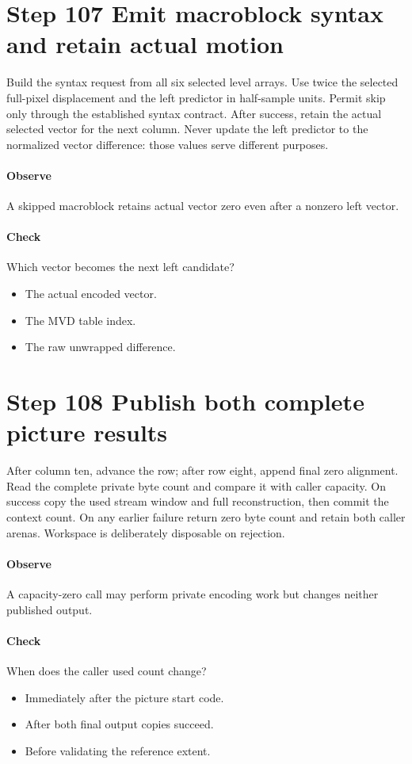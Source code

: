 \section{Step 107 Emit macroblock syntax and retain actual motion}\label{h263-picture-s07}
Build the syntax request from all six selected level arrays. Use twice the
selected full-pixel displacement and the left predictor in half-sample units.
Permit skip only through the established syntax contract. After success, retain
the actual selected vector for the next column. Never update the left predictor
to the normalized vector difference: those values serve different purposes.

\paragraph{Observe} A skipped macroblock retains actual vector zero even after a nonzero left vector.
\paragraph{Check} Which vector becomes the next left candidate?
\begin{itemize}
  \item[A.] The actual encoded vector.
  \item[B.] The MVD table index.
  \item[C.] The raw unwrapped difference.
\end{itemize}

\section{Step 108 Publish both complete picture results}\label{h263-picture-s08}
After column ten, advance the row; after row eight, append final zero alignment.
Read the complete private byte count and compare it with caller capacity. On
success copy the used stream window and full reconstruction, then commit the
context count. On any earlier failure return zero byte count and retain both
caller arenas. Workspace is deliberately disposable on rejection.

\paragraph{Observe} A capacity-zero call may perform private encoding work but changes neither published output.
\paragraph{Check} When does the caller used count change?
\begin{itemize}
  \item[A.] Immediately after the picture start code.
  \item[B.] After both final output copies succeed.
  \item[C.] Before validating the reference extent.
\end{itemize}

